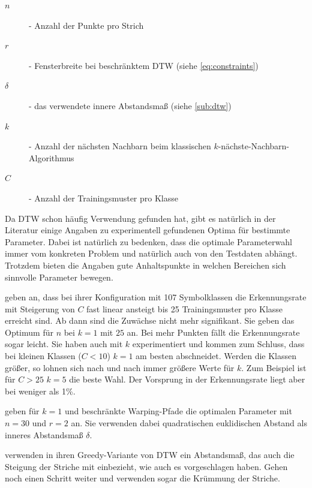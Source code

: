 \begin{description}
  \item[$n$] - Anzahl der Punkte pro Strich
  \item[$r$] - Fensterbreite bei beschränktem DTW (siehe \ref{eq:constraints})
  \item[$\delta$] - das verwendete innere Abstandsmaß (siehe \ref{sub:dtw})
  \item[$k$] - Anzahl der nächsten Nachbarn beim klassischen $k$-nächste-Nachbarn-Algorithmus
  \item[$C$] - Anzahl der Trainingsmuster pro Klasse
\end{description}

Da DTW schon häufig Verwendung gefunden hat, gibt es natürlich in der Literatur einige Angaben zu experimentell gefundenen Optima für bestimmte Parameter. Dabei ist natürlich zu bedenken, dass die optimale Parameterwahl immer vom konkreten Problem und natürlich auch von den Testdaten abhängt. Trotzdem bieten die Angaben gute Anhaltspunkte in welchen Bereichen sich sinnvolle Parameter bewegen.

\citet{Golubitsky:2009p1842} geben an, dass bei ihrer Konfiguration mit 107 Symbolklassen die Erkennungsrate mit Steigerung von $C$ fast linear ansteigt bis 25 Trainingsmuster pro Klasse erreicht sind. Ab dann sind die Zuwächse nicht mehr signifikant. Sie geben das Optimum für $n$ bei $k = 1$ mit $25$ an. Bei mehr Punkten fällt die Erkennungsrate sogar leicht. Sie haben auch mit $k$ experimentiert und kommen zum Schluss, dass bei kleinen Klassen ($C<10$) $k = 1$ am besten abschneidet. Werden die Klassen größer, so lohnen sich nach und nach immer größere Werte für $k$. Zum Beispiel ist für $C>25$  $k=5$ die beste Wahl. Der Vorsprung in der Erkennungsrate liegt aber bei weniger als 1\%.

\citet{Golubitsky:2009p2433} geben für $k=1$ und beschränkte Warping-Pfade die optimalen Parameter mit $n = 30$ und $r = 2$ an. Sie verwenden dabei quadratischen euklidischen Abstand als inneres Abstandsmaß $\delta$.

\citet{MacLean:2010p9970} verwenden in ihren Greedy-Variante von DTW ein Abstandsmaß, das auch die Steigung der Striche mit einbezieht, wie auch \citet{Tappert:1982p10305} es vorgeschlagen haben.
\citet{Vuong:2010p10279} Gehen noch einen Schritt weiter und verwenden sogar die Krümmung der Striche.